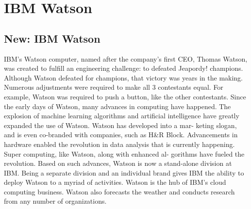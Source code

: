 \section{IBM Watson}




\subsection{New: IBM Watson}

IBM’s Watson computer, named after the company’s first CEO, Thomas
Watson, was created to fulfill an engineering challenge: to defeated
Jeapordy! champions\cite{hid-sp18-525-watson}. Although Watson defeated
for champions, that victory was years in the making.  Numerous
adjustments were required to make all 3 contestants equal.  For
example, Watson was required to push a button, like the other
contestants\cite{hid-sp18-525-watson}. Since the early days of Watson,
many advances in computing have happened. The explosion of machine
learning algorithms and artificial intelligence have greatly expanded
the use of Watson. Watson has developed into a mar- keting slogan, and
is even co-branded with companies, such as H\&R
Block\cite{hid-sp18-525-watson}. Advancements in hardware enabled the
revolution in data analysis that is currently happening. Super
computing, like Watson, along with enhanced al- gorithms have fueled
the revolution. Based on such advances, Watson is now a stand-alone
division at IBM\cite{hid-sp18-525-watson}. Being a separate division and
an individual brand gives IBM the ability to deploy Watson to a myriad
of activities. Watson is the hub of IBM’s cloud computing business.
Watson also forecasts the weather and conducts research from any
number of organizations\cite{hid-sp18-525-watson}.

